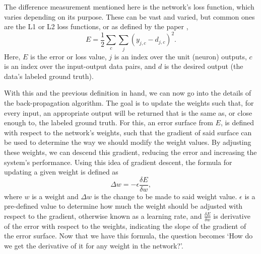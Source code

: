\documentclass[11pt,a4paper,oldfontcommands]{memoir}
\begin{document}
The difference measurement mentioned here is the network's loss function, which varies depending on its purpose. These can be vast and varied, but common ones are the L1 or L2 loss functions, or as defined by the paper \cite{backprop},
\begin{equation}
    E = \frac{1}{2}\sum\limits_c\sum\limits_j(y_{j,c} - d_{j, c})^2 .
    \label{eq:bp_3}
\end{equation}
Here, $E$ is the error or loss value, $j$ is an index over the unit (neuron) outputs, $c$ is an index over the input-output data pairs, and $d$ is the desired output (the data's labeled ground truth).

With this and the previous definition in hand, we can now go into the details of the back-propagation algorithm. The goal is to update the weights such that, for every input, an appropriate output will be returned that is the same as, or close enough to, the labeled ground truth. For this, an error surface from $E$, is defined with respect to the network's weights, such that the gradient of said surface can be used to determine the way we should modify the weight values. By adjusting these weights, we can descend this gradient, reducing the error and increasing the system's performance. Using this idea of gradient descent, the formula for updating a given weight is defined as
\begin{equation}
    \Delta w = -\epsilon\frac{\delta E}{\delta w} ,
    \label{eq:bp_8}
\end{equation}
where $w$ is a weight and $\Delta w$ is the change to be made to said weight value. $\epsilon$ is a pre-defined value to determine how much the weight should be adjusted with respect to the gradient, otherwise known as a learning rate, and $\frac{\delta E}{\delta w}$ is derivative of the error with respect to the weights, indicating the slope of the gradient of the error surface. Now that we have this formula, the question becomes `How do we get the derivative of it for any weight in the network?'.
\end{document}
